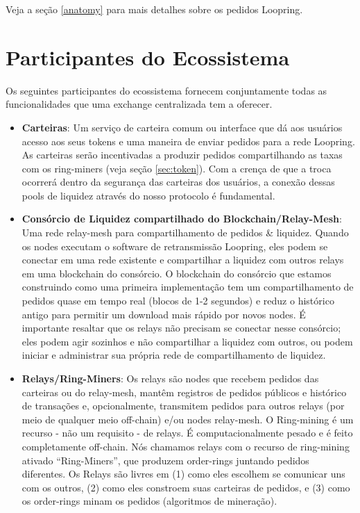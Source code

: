\documentclass[UTF8,nofonts]{article}
\begin{document}
\begin{multicols}{2}
Veja a seção \ref{anatomy} para mais detalhes sobre os pedidos Loopring.



\section{Participantes do Ecossistema\label{sec:ecosystem}}
Os seguintes participantes do ecossistema fornecem conjuntamente todas as funcionalidades que uma exchange centralizada tem a oferecer.

\begin{itemize}

\item \textbf{Carteiras}: Um serviço de carteira comum ou interface que dá aos usuários acesso aos seus tokens e uma maneira de enviar pedidos para a rede Loopring. As carteiras serão incentivadas a produzir pedidos compartilhando as taxas com os ring-miners (veja seção \ref{sec:token}). Com a crença de que a troca ocorrerá dentro da segurança das carteiras dos usuários, a conexão dessas pools de liquidez através do nosso protocolo é fundamental.

\item \textbf{Consórcio de Liquidez compartilhado do Blockchain/Relay-Mesh}: Uma rede relay-mesh para compartilhamento de pedidos \& liquidez. Quando os nodes executam o software de retransmissão Loopring, eles podem se conectar em uma rede existente e compartilhar a liquidez com outros relays em uma blockchain do consórcio. O blockchain do consórcio que estamos construindo como uma primeira implementação tem um compartilhamento de pedidos quase em tempo real (blocos de 1-2 segundos) e reduz o histórico antigo para permitir um download mais rápido por novos nodes. É importante resaltar que os relays  não precisam se conectar nesse consórcio; eles podem agir sozinhos e não compartilhar a liquidez com outros, ou podem iniciar e administrar sua própria rede de compartilhamento de liquidez.

\item \textbf{Relays/Ring-Miners}: Os relays são nodes que recebem pedidos das carteiras ou do relay-mesh, mantêm registros de pedidos públicos e histórico de transações e, opcionalmente, transmitem pedidos para outros relays (por meio de qualquer meio off-chain) e/ou nodes relay-mesh. O Ring-mining é um recurso - não um requisito - de relays. É computacionalmente pesado e é feito completamente off-chain. Nós chamamos relays com o recurso de ring-mining ativado \enquote{Ring-Miners}, que produzem order-rings juntando pedidos diferentes. Os Relays são livres em (1) como eles escolhem se comunicar uns com os outros, (2) como eles constroem suas carteiras de pedidos, e (3) como os order-rings minam os pedidos (algoritmos de mineração).


\end{itemize}
\end{multicols}
\end{document}
